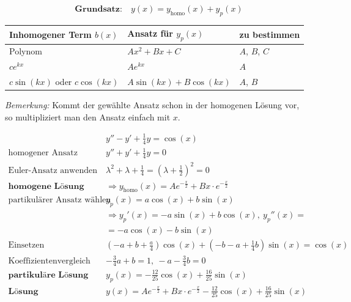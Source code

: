 \begin{equation*}
	\textbf{Grundsatz:}\quad y(x) = y_\text{homo}(x) + y_p(x)
\end{equation*}

\begin{table}[H]
\centering
\begin{tabular}{|l|l|l|}
\hline
\textbf{Inhomogener Term $b(x)$} & \textbf{Ansatz f{\"u}r $y_p(x)$}	& \textbf{zu bestimmen}		\\ \hline
Polynom				& $Ax^2 + Bx + C$			& $A$, $B$, $C$		\\ \hline
$c e^{k x}$ & $Ae^{kx}$					& $A$				\\ \hline
$c\sin(kx)$ oder $c\cos(kx)$ & $A\sin(kx) + B\cos(kx)$ & $A$, $B$ \\ \hline

\end{tabular}
\end{table}

\emph{Bemerkung:} Kommt der gew{\"a}hlte Ansatz schon in der homogenen L{\"o}sung vor,\\ so multipliziert man den Ansatz einfach mit $x$.

\begin{equation*}
\begin{split}
	& y'' - y' + \frac{1}{4}y = \cos(x) \\
	\text{homogener Ansatz}\quad & y'' + y' + \frac{1}{4}y = 0 \\
	\text{Euler-Ansatz anwenden}\quad & \lambda^2 + \lambda + \frac{1}{4} = (\lambda + \frac{1}{2})^2 = 0 \\
	\textbf{homogene L{\"o}sung}\quad &\Rightarrow y_\text{homo}(x) = Ae^{-\frac{x}{2}} + Bx \cdot e^{-\frac{x}{2}} \\
	\text{partikul{\"a}rer Ansatz w{\"a}hlen}\quad & y_p(x) = a\cos(x) + b\sin(x) \\
							  & \Rightarrow y_p'(x) = -a\sin(x) + b\cos(x),\  y_p''(x) = \\ & = -a\cos(x) -b \sin(x) \\
	\text{Einsetzen}\quad & (-a + b + \frac{a}{4})\cos(x) + (-b -a + \frac{1}{4}b)\sin(x) = \cos(x) \\
	\text{Koeffizientenvergleich}\quad & -\frac{3}{4}a + b = 1,\ -a-\frac{3}{4}b = 0 \\
	\textbf{partikul{\"a}re L{\"o}sung}\quad & y_p(x) = -\frac{12}{25}\cos(x) + \frac{16}{25}\sin(x) \\
	\textbf{L{\"o}sung}\quad & y(x) = Ae^{-\frac{x}{2}} + Bx \cdot e^{-\frac{x}{2}} -\frac{12}{25}\cos(x) + \frac{16}{25}\sin(x)
\end{split}
\end{equation*}
